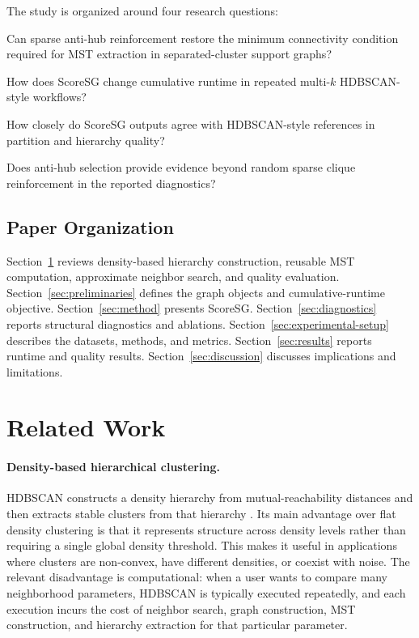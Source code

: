 \documentclass[11pt]{article}
\begin{document}
The study is organized around four research questions:
\begin{description}[leftmargin=*,font=\normalfont\bfseries]
  \item[RQ1.] Can sparse anti-hub reinforcement restore the minimum connectivity condition required for MST extraction in separated-cluster support graphs?
  \item[RQ2.] How does ScoreSG change cumulative runtime in repeated multi-\(k\) HDBSCAN-style workflows?
  \item[RQ3.] How closely do ScoreSG outputs agree with HDBSCAN-style references in partition and hierarchy quality?
  \item[RQ4.] Does anti-hub selection provide evidence beyond random sparse clique reinforcement in the reported diagnostics?
\end{description}

\subsection{Paper Organization}

Section~\ref{sec:related-work} reviews density-based hierarchy construction, reusable MST computation, approximate neighbor search, and quality evaluation. Section~\ref{sec:preliminaries} defines the graph objects and cumulative-runtime objective. Section~\ref{sec:method} presents ScoreSG. Section~\ref{sec:diagnostics} reports structural diagnostics and ablations. Section~\ref{sec:experimental-setup} describes the datasets, methods, and metrics. Section~\ref{sec:results} reports runtime and quality results. Section~\ref{sec:discussion} discusses implications and limitations.

\section{Related Work}
\label{sec:related-work}

\paragraph{Density-based hierarchical clustering.}
HDBSCAN constructs a density hierarchy from mutual-reachability distances and then extracts stable clusters from that hierarchy \citep{campello2013density,campello2015hierarchical}. Its main advantage over flat density clustering is that it represents structure across density levels rather than requiring a single global density threshold. This makes it useful in applications where clusters are non-convex, have different densities, or coexist with noise. The relevant disadvantage is computational: when a user wants to compare many neighborhood parameters, HDBSCAN is typically executed repeatedly, and each execution incurs the cost of neighbor search, graph construction, MST construction, and hierarchy extraction for that particular parameter.
\end{document}
